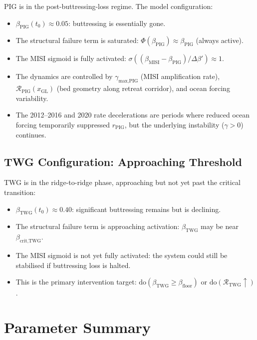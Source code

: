 \documentclass[11pt]{article}
\theoremstyle{definition}
\begin{document}
PIG is in the post-buttressing-loss regime.  The model configuration:
\begin{itemize}
  \item $\beta_\text{PIG}(t_0) \approx 0.05$: buttressing is essentially gone.
  \item The structural failure term is saturated: $\Phi(\beta_\text{PIG}) \approx \beta_\text{PIG}$ (always active).
  \item The MISI sigmoid is fully activated: $\sigma((\beta_{\text{MISI}} - \beta_\text{PIG})/\Delta\beta') \approx 1$.
  \item The dynamics are controlled by $\gamma_{\text{max},\text{PIG}}$ (MISI amplification rate), $\mathcal{R}_\text{PIG}(x_\text{GL})$ (bed geometry along retreat corridor), and ocean forcing variability.
  \item The 2012--2016 and 2020 rate decelerations are periods where reduced ocean forcing temporarily suppressed $r_\text{PIG}$, but the underlying instability ($\gamma > 0$) continues.
\end{itemize}

\subsection{TWG Configuration: Approaching Threshold}

TWG is in the ridge-to-ridge phase, approaching but not yet past the critical transition:
\begin{itemize}
  \item $\beta_\text{TWG}(t_0) \approx 0.40$: significant buttressing remains but is declining.
  \item The structural failure term is approaching activation: $\beta_\text{TWG}$ may be near $\beta_{\text{crit},\text{TWG}}$.
  \item The MISI sigmoid is not yet fully activated: the system could still be stabilised if buttressing loss is halted.
  \item This is the primary intervention target: $\text{do}(\beta_\text{TWG} \geq \beta_{\text{floor}})$ or $\text{do}(\mathcal{R}_\text{TWG} \uparrow)$.
\end{itemize}


\section{Parameter Summary}
\label{sec:parameters}
\end{document}
